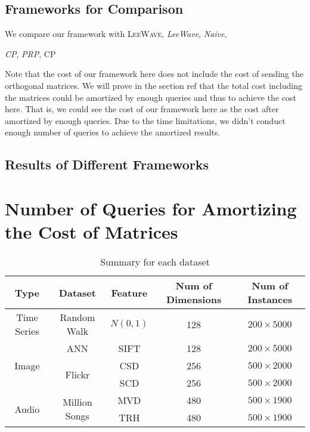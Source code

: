 \subsection{Frameworks for Comparison} %
\label{ss:frameworks_for_comparison}

We compare our framework with 
\textsc{LeeWave},
\emph{LeeWave},
\emph{Naive},

\emph{CP},
\emph{PRP},
\textsc{CP}

Note that the cost of our framework here does not include the cost of sending the orthogonal matrices.  We will prove in the section ref that the total cost including the matrices could be amortized by enough queries and thus to achieve the cost here.  That is, we could see the cost of our framework here as the cost after amortized by enough queries.  Due to the time limitations, we didn't conduct enough number of queries to achieve the amortized results.



\subsection{Results of Different Frameworks} %
\label{sub:results_of_different_fra}






\section{Number of Queries for Amortizing the Cost of Matrices} %
\label{s:number_of_queries_for_amortizing_the_cost_of_matrices}

\begin{table}[htpb]\begin{center}
\caption{Summary for each dataset}\label{table:datasets}
\begin{tabular}{|c|c|c|c|c|}
\hline 
Type & Dataset & Feature & Num of Dimensions & Num of Instances\\ \hline \hline
Time Series & Random Walk & $N(0,1)$ & 128 & $200\times 5000$\\ \hline
\multirow{3}{*}{Image} & ANN & SIFT & 128 & $200\times 5000$\\ 
\cline{2-5}
 & \multirow{2}{*}{Flickr} & CSD & 256 & $500\times 2000$\\ 
 & & SCD & 256 & $500\times 2000$\\ \hline
 \multirow{2}{*}{Audio} & \multirow{2}{*}{Million Songs} & MVD & 480 & $500\times 1900$ \\ 
 \cline{3-5}
 & & TRH & 480 & $500\times 1900$\\ \hline
\end{tabular}
\end{center}\end{table}


